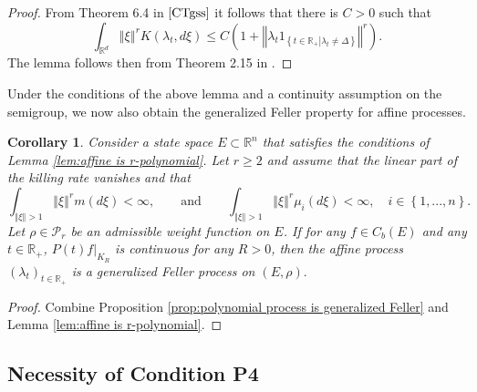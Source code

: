 \documentclass[a4paper,12pt]{article}
\newtheorem{corollary}[theorem]{Corollary}
\theoremstyle{definition}
\theoremstyle{remark}
\numberwithin{equation}{section}
\numberwithin{theorem}{section}
\begin{document}
\begin{proof}
From Theorem 6.4 in $\cite{CTgss}$
it follows that there is $C>0$ such that
\[
\int_{\mathbb{R}^{d}}\left\Vert \xi\right\Vert ^{r}K\left(\lambda_{t},d\xi\right)\leq C\left(1+\left\Vert \lambda_{t}1_{\left\{ \left.t\in\mathbb{R}_{+}\right|\lambda_{t}\neq \Delta\right\} }\right\Vert ^{r}\right).
\]
The lemma follows then from Theorem 2.15 in \cite{CMT}. 
\end{proof}

Under the conditions of the above lemma  and a continuity assumption on the semigroup, we now also obtain the generalized Feller property for affine processes.

\begin{corollary}
\label{cor:affine process is generalized Feller}
Consider a state space $E\subset\mathbb{R}^{n}$ that satisfies the conditions of Lemma \ref{lem:affine is r-polynomial}.  
Let $r\geq2$ and assume that the linear part of the killing rate vanishes and that
\[
\int_{\left\Vert \xi\right\Vert >1}\left\Vert \xi\right\Vert ^{r}m\left(d\xi\right)<\infty, \qquad \text{and} \qquad 
\int_{\left\Vert \xi\right\Vert >1}\left\Vert \xi\right\Vert ^{r}\mu_{i}\left(d\xi\right)<\infty, \quad i\in\left\{ 1,...,n\right\}.
\]
Let $\rho\in\mathcal{P}_{r}$ be an admissible weight function on
$E$. If for any $f\in C_{b}(E)$ and any $t\in\mathbb{R}_{+}$, 
$\left.P(t)f\right|_{K_{R}}$ is continuous for any $R>0$, then the affine process $\left(\lambda_{t}\right)_{t\in\mathbb{R}_{+}}$
is a generalized Feller process on $\left(E,\rho\right).$
\end{corollary}

\begin{proof}
Combine Proposition \ref{prop:polynomial process is generalized Feller}
and Lemma \ref{lem:affine is r-polynomial}.
\end{proof}

\subsection{Necessity of Condition \textbf{P4}} 
\label{eq:secP4}
\end{document}
